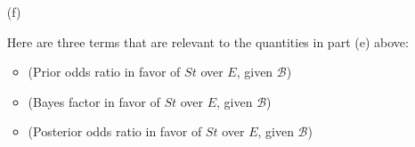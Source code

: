 \documentclass[12pt]{article}
\newcommand{\given}{\, | \,}
\newenvironment{solution}{\begin{proof}[\textbf{\textit{Solution}}] }{\end{proof}}
\begin{document}
\begin{itemize}
\begin{solution}
    We know though $P(St \given Sh, \mathcal{B})$ to be,
    \begin{align*}
        P(St \given Sh, \mathcal{B}) = \dfrac{P(St \given \mathcal{B}) P(Sh \given St, \mathcal{B})}{P(Sh \given \mathcal{B})}
    \end{align*}
    and $P(E \given Sh, \mathcal{B})$ to be,
    \begin{align*}
        P(E \given Sh, \mathcal{B}) = \dfrac{P(E \given \mathcal{B}) P(Sh \given E, \mathcal{B})}{P(Sh \given \mathcal{B})}.
    \end{align*}
    Using this to expand equation (5) we get,
    \begin{align*}
        o_{St \given Sh, \mathcal{B}} = \dfrac{P(St \given Sh, \mathcal{B})}{P(E \given Sh, \mathcal{B})} &= \dfrac{P(St \given \mathcal{B}) P(Sh \given St, \mathcal{B})}{P(Sh \given \mathcal{B})} \cdot \dfrac{P(Sh \given \mathcal{B})}{P(E \given \mathcal{B}) P(Sh \given E, \mathcal{B})} \\
        &= \dfrac{P(St \given \mathcal{B}) P(Sh \given St, \mathcal{B})}{P(E \given \mathcal{B}) P(Sh \given E, \mathcal{B})} \\
        &= \left[\dfrac{P(St \given \mathcal{B})}{P(E \given \mathcal{B})}\right] \cdot \left[\dfrac{P(Sh \given St, \mathcal{B})}{P(Sh \given E, \mathcal{B})}\right]
    \end{align*}
    which is the same as the expression give, which is why it is a correct use of Bayes' Theorem on the odds ratio scale in this problem. 
\end{solution}

\vspace*{0.5in}
 \newpage
\item[(f)]

Here are three terms that are relevant to the quantities in part (e) above:

\begin{itemize}

\item

(Prior odds ratio in favor of $St$ over $E$, given $\mathcal{ B }$)

\item

(Bayes factor in favor of $St$ over $E$, given $\mathcal{ B }$)

\item

(Posterior odds ratio in favor of $St$ over $E$, given $\mathcal{ B }$)


\end{itemize}
\end{itemize}
\end{document}
